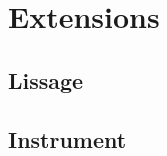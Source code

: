 \documentclass[a4paper,oneside,10pt]{article}
\begin{document}
\section{Extensions}

\subsection{Lissage}

\subsection{Instrument}
\end{document}
